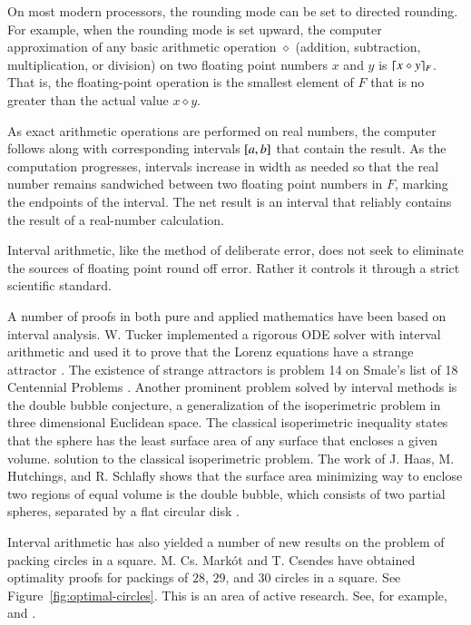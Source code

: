 On most modern processors, the rounding mode can be set to directed
rounding.  For example, when the rounding mode is set upward, the
computer approximation of any basic arithmetic operation $\diamond$
(addition, subtraction, multiplication, or division) on two floating
point numbers $x$ and $y$ is $\lceil x\diamond y\rceil_F$.  That is, the
floating-point operation is the smallest element of $F$ that is no
greater than the actual value $x\diamond y$.

As exact arithmetic operations are performed on real numbers, the
computer follows along with corresponding intervals $[
a,b]$ that contain the result.  As the computation
progresses, intervals increase in width as needed so that the real
number remains sandwiched between two floating point numbers in $F$, marking
the endpoints of the interval.
The net result is an interval that reliably contains the result of a
real-number calculation.

Interval arithmetic, like the method of deliberate error, does not
seek to eliminate the sources of floating point round off error.
Rather it controls it through a strict scientific standard.


A number of proofs in both pure and applied mathematics have been
based on interval analysis.  W. Tucker implemented a rigorous ODE
solver with interval arithmetic and used it to prove that the Lorenz
equations have a strange attractor \cite{Tuc02}. The existence of
strange attractors is problem 14 on Smale's list of 18 Centennial
Problems \cite{Sma98}.  Another prominent problem solved by interval
methods is the double bubble conjecture, a generalization of the
isoperimetric problem in three dimensional Euclidean space.  The
classical isoperimetric inequality states that the sphere has the
least surface area of any surface that encloses a given volume.
solution to the classical isoperimetric problem.  The work of J. Haas,
M. Hutchings, and R. Schlafly shows that the surface area minimizing
way to enclose two regions of equal volume is the double bubble, which
consists of two partial spheres, separated by a flat circular disk
\cite{HHS95}.

Interval arithmetic has also yielded a number of new results on the
problem of packing circles in a square. M. Cs. Mark\'ot and T. Csendes
have obtained optimality proofs for packings of $28$, $29$, and $30$
circles in a square.  See Figure~\ref{fig:optimal-circles}.  This is
an area of active research. See, for example, \cite{Sza07} and
\cite{Mark07}.


